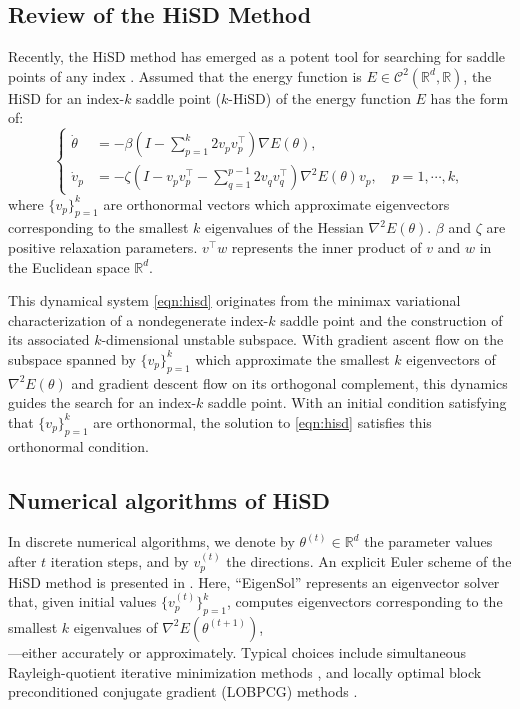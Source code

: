 \documentclass[final]{siamart251216}
\begin{document}
\subsection{Review of the HiSD Method}
Recently, the HiSD method has emerged as a potent tool for searching for saddle points of any index \cite{yin2019high}. 
Assumed that the energy function is $E\in \mathcal{C}^2(\mathbb{R}^d, \mathbb{R})$,
the HiSD for an index-$k$ saddle point ($k$-HiSD) of the energy function $E$ has the form of:
\begin{equation}\label{eqn:hisd}
\left\{
\begin{aligned}
\dot{\theta} & = - \beta
\left( I - \sum_{p=1}^k 2v_p v_p^\top \right)
\nabla E(\theta),\\
\dot{v}_p &=-\zeta
\left(I-v_pv_p^\top-\sum_{q=1}^{p-1}2v_qv_q^\top\right)
\nabla^2E(\theta)v_p, \quad p=1,\cdots,k,
\end{aligned}
\right.
\end{equation}
where $\{v_p\}_{p=1}^k$ are orthonormal vectors which approximate eigenvectors corresponding to the smallest $k$ eigenvalues of the Hessian $\nabla^2 E(\theta)$.
$\beta$ and $\zeta$ are positive relaxation parameters.
$v^\top w$ represents the inner product of $v$ and $w$ in the Euclidean space $\mathbb{R}^d$.

This dynamical system \eqref{eqn:hisd} originates from the minimax variational characterization of a nondegenerate index-$k$ saddle point and the construction of its associated $k$-dimensional unstable subspace. 
With gradient ascent flow on the subspace spanned by $\{v_p\}_{p=1}^k$ which approximate the smallest $k$ eigenvectors of $\nabla^2E(\theta)$ and gradient descent flow on its orthogonal complement, this dynamics guides the search for an index-$k$ saddle point.
With an initial condition satisfying that $\{v_p\}_{p=1}^k$ are orthonormal, the solution to \eqref{eqn:hisd} satisfies this orthonormal condition. 

\subsection{Numerical algorithms of HiSD}
In discrete numerical algorithms, we denote by $\theta^{(t)}\in \mathbb{R}^{d}$ the parameter values after $t$ iteration steps, and by $v_p^{(t)}$ the directions. 
An explicit Euler scheme of the HiSD method is presented in .
Here, ``EigenSol'' represents an eigenvector solver that, given initial values $\{ v_p^{(t)}\}_{p=1}^k$, computes eigenvectors corresponding to the smallest $k$  eigenvalues of $\nabla^2 E(\theta^{(t+1)})$, \\---either accurately or approximately. Typical choices include simultaneous Rayleigh-quotient iterative minimization methods  \cite{longsine1980simultaneous}, and locally optimal block preconditioned conjugate gradient (LOBPCG) methods \cite{knyazev2001toward}.
\end{document}
